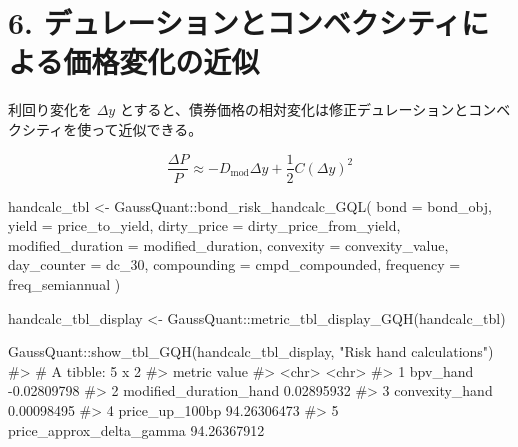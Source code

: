 \documentclass[
  letterpaper,
  DIV=11,
  numbers=noendperiod]{scrreprt}
\newenvironment{Shaded}{\begin{snugshade}}{\end{snugshade}}
\newcommand{\AttributeTok}[1]{\textcolor[rgb]{0.40,0.45,0.13}{#1}}
\newcommand{\CommentTok}[1]{\textcolor[rgb]{0.37,0.37,0.37}{#1}}
\newcommand{\FunctionTok}[1]{\textcolor[rgb]{0.28,0.35,0.67}{#1}}
\newcommand{\NormalTok}[1]{\textcolor[rgb]{0.00,0.23,0.31}{#1}}
\newcommand{\OtherTok}[1]{\textcolor[rgb]{0.00,0.23,0.31}{#1}}
\newcommand{\SpecialCharTok}[1]{\textcolor[rgb]{0.37,0.37,0.37}{#1}}
\newcommand{\StringTok}[1]{\textcolor[rgb]{0.13,0.47,0.30}{#1}}
\begin{document}
\section{6.
デュレーションとコンベクシティによる価格変化の近似}\label{ux30c7ux30e5ux30ecux30fcux30b7ux30e7ux30f3ux3068ux30b3ux30f3ux30d9ux30afux30b7ux30c6ux30a3ux306bux3088ux308bux4fa1ux683cux5909ux5316ux306eux8fd1ux4f3c}

利回り変化を \(\Delta y\)
とすると、債券価格の相対変化は修正デュレーションとコンベクシティを使って近似できる。

\[
\frac{\Delta P}{P}
\approx
-D_{\mathrm{mod}}\Delta y
+\frac{1}{2}C(\Delta y)^2
\]

\begin{Shaded}
\begin{Highlighting}[]
\NormalTok{handcalc\_tbl }\OtherTok{\textless{}{-}}\NormalTok{ GaussQuant}\SpecialCharTok{::}\FunctionTok{bond\_risk\_handcalc\_GQL}\NormalTok{(}
  \AttributeTok{bond =}\NormalTok{ bond\_obj,}
  \AttributeTok{yield =}\NormalTok{ price\_to\_yield,}
  \AttributeTok{dirty\_price =}\NormalTok{ dirty\_price\_from\_yield,}
  \AttributeTok{modified\_duration =}\NormalTok{ modified\_duration,}
  \AttributeTok{convexity =}\NormalTok{ convexity\_value,}
  \AttributeTok{day\_counter =}\NormalTok{ dc\_30,}
  \AttributeTok{compounding =}\NormalTok{ cmpd\_compounded,}
  \AttributeTok{frequency =}\NormalTok{ freq\_semiannual}
\NormalTok{)}

\NormalTok{handcalc\_tbl\_display }\OtherTok{\textless{}{-}}\NormalTok{ GaussQuant}\SpecialCharTok{::}\FunctionTok{metric\_tbl\_display\_GQH}\NormalTok{(handcalc\_tbl)}

\NormalTok{GaussQuant}\SpecialCharTok{::}\FunctionTok{show\_tbl\_GQH}\NormalTok{(handcalc\_tbl\_display, }\StringTok{"Risk hand calculations"}\NormalTok{)}
\CommentTok{\#\textgreater{} \# A tibble: 5 x 2}
\CommentTok{\#\textgreater{}   metric                   value      }
\CommentTok{\#\textgreater{}   \textless{}chr\textgreater{}                    \textless{}chr\textgreater{}      }
\CommentTok{\#\textgreater{} 1 bpv\_hand                 {-}0.02809798}
\CommentTok{\#\textgreater{} 2 modified\_duration\_hand   0.02895932 }
\CommentTok{\#\textgreater{} 3 convexity\_hand           0.00098495 }
\CommentTok{\#\textgreater{} 4 price\_up\_100bp           94.26306473}
\CommentTok{\#\textgreater{} 5 price\_approx\_delta\_gamma 94.26367912}
\end{Highlighting}
\end{Shaded}
\end{document}
